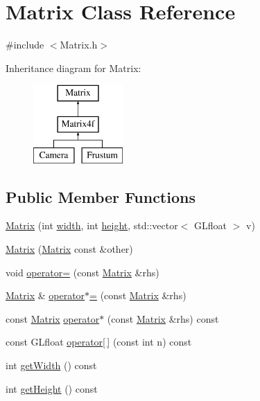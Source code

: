 \hypertarget{class_matrix}{
\section{\-Matrix \-Class \-Reference}
\label{class_matrix}
}


{\ttfamily \#include $<$\-Matrix.\-h$>$}

\-Inheritance diagram for \-Matrix\-:\begin{figure}[H]
\begin{center}
\leavevmode
\includegraphics[height=3.000000cm]{class_matrix}
\end{center}
\end{figure}
\subsection*{\-Public \-Member \-Functions}
\begin{DoxyCompactItemize}
\item 
\hyperlink{class_matrix_ad38857ddffc21c51fcf626e284e7282f}{\-Matrix} (int \hyperlink{class_matrix_ad4320bd2dc03fd11887d3ba350c6c8ef}{width}, int \hyperlink{class_matrix_a0b5614256a04ece0ea54b8aad7e6980c}{height}, std\-::vector$<$ \-G\-Lfloat $>$ v)
\item 
\hyperlink{class_matrix_ab19b1c231dedb3ab0b11af42e9aa7ef4}{\-Matrix} (\hyperlink{class_matrix}{\-Matrix} const \&other)
\item 
void \hyperlink{class_matrix_a130e415b12d0a0c338d8d0961131bc3e}{operator=} (const \hyperlink{class_matrix}{\-Matrix} \&rhs)
\item 
\hyperlink{class_matrix}{\-Matrix} \& \hyperlink{class_matrix_ab25d7df6ae0a248aa220b6191f56961a}{operator$\ast$=} (const \hyperlink{class_matrix}{\-Matrix} \&rhs)
\item 
const \hyperlink{class_matrix}{\-Matrix} \hyperlink{class_matrix_a6e1a01475e178191c70a488bb7316903}{operator$\ast$} (const \hyperlink{class_matrix}{\-Matrix} \&rhs) const 
\item 
const \-G\-Lfloat \hyperlink{class_matrix_a19a5cc379e90bc99e6dcee1f8a79dfb1}{operator\mbox{[}$\,$\mbox{]}} (const int n) const 
\item 
int \hyperlink{class_matrix_a3b8788a3ed5bbc00cea54d4be60ef786}{get\-Width} () const 
\item 
int \hyperlink{class_matrix_a2c8ede48d107858a2308a6c530135eed}{get\-Height} () const 
\end{DoxyCompactItemize}
